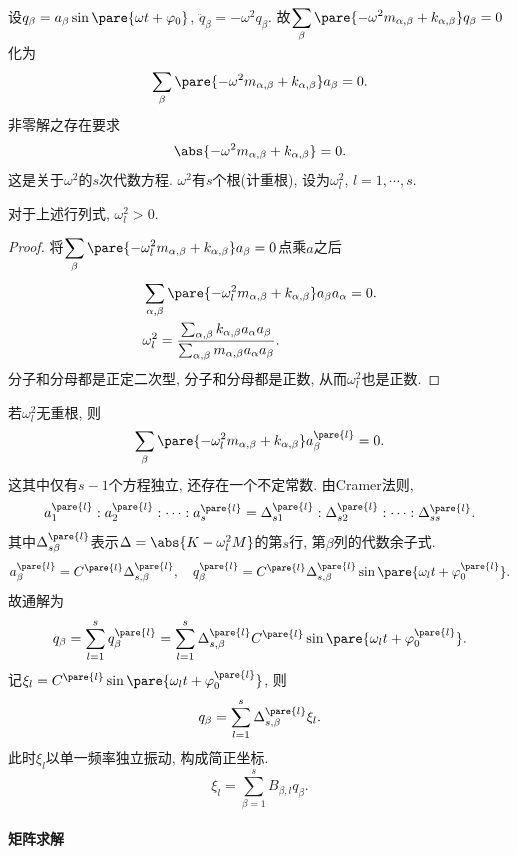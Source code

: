 \documentclass{ctexart}
\begin{document}
设$q_\beta = a_\beta \sin\pare{\omega t + \varphi_0}$, $\ddot{q}_\beta = -\omega^2 q_\beta$. 故$\displaystyle \sum_\beta \pare{-\omega^2 m_{\alpha,\beta} + k_{\alpha,\beta}}q_\beta = 0$化为
\[ \sum_\beta \pare{-\omega^2 m_{\alpha,\beta} + k_{\alpha,\beta}} a_\beta = 0. \]
非零解之存在要求
\[ \abs{-\omega^2 m_{\alpha,\beta} + k_{\alpha,\beta}} = 0. \]
这是关于$\omega^2$的$s$次代数方程. $\omega^2$有$s$个根(计重根), 设为$\omega_l^2$, $l=1,\cdots, s$.
\begin{lemma}
    对于上述行列式, $\omega_l^2 > 0$.
\end{lemma}
\begin{proof}
    将$\displaystyle \sum_\beta \pare{-\omega_l^2 m_{\alpha,\beta} + k_{\alpha,\beta}} a_\beta = 0$点乘$a$之后
    \begin{align*}
        & \sum_{\alpha,\beta} \pare{-\omega_l^2 m_{\alpha,\beta} + k_{\alpha,\beta}}a_\beta a_\alpha = 0. \\
        & \omega_l^2 = \frac{\sum_{\alpha,\beta} k_{\alpha,\beta} a_\alpha a_\beta}{\sum_{\alpha,\beta} m_{\alpha,\beta} a_\alpha a_\beta}.
    \end{align*}
    分子和分母都是正定二次型, 分子和分母都是正数, 从而$\omega_l^2$也是正数.
\end{proof}
若$\omega_l^2$无重根, 则
\[ \sum_\beta \pare{-\omega_l^2 m_{\alpha,\beta} + k_{\alpha,\beta}} a_\beta^{\pare{l}} = 0. \]
这其中仅有$s-1$个方程独立, 还存在一个不定常数. 由Cramer法则,
\[ a_1^{\pare{l}} : a_2^{\pare{l}} : \cdots : a_s^{\pare{l}} = \Delta_{s1}^{\pare{l}} : \Delta_{s2}^{\pare{l}} : \cdots : \Delta_{ss}^{\pare{l}}. \]
其中$\Delta_{s\beta}^{\pare{l}}$表示$\Delta = \abs{K - \omega_l^2 M}$的第$s$行, 第$\beta$列的代数余子式.
\[ a_\beta^{\pare{l}} = C^{\pare{l}} \Delta_{s,\beta}^{\pare{l}},\quad q_\beta^{\pare{l}} = C^{\pare{l}} \Delta_{s,\beta}^{\pare{l}} \sin\pare{\omega_l t + \varphi_0^{\pare{l}}}. \]
故通解为
\[ q_\beta = \sum_{l=1}^s q_\beta^{\pare{l}} = \sum_{l=1}^s \Delta_{s,\beta}^{\pare{l}} C^{\pare{l}} \sin\pare{\omega_l t + \varphi_0^{\pare{l}}}. \]
记$\xi_l = C^{\pare{l}} \sin\pare{\omega_l t + \varphi_0^{\pare{l}}}$, 则
\[ q_\beta = \sum_{l=1}^s \Delta_{s,\beta}^{\pare{l}} \xi_l. \]
此时$\xi_l$以单一频率独立振动, 构成简正坐标.
\[ \xi_l = \sum_{\beta = 1}^s B_{\beta, l}q_\beta. \]


\paragraph{矩阵求解} %
\label{par:矩阵求解}
\end{document}
